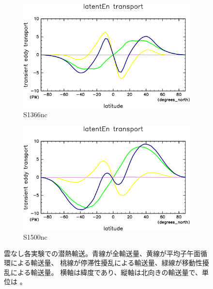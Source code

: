 \documentclass[body]{subfiles}
\begin{document}
\begin{figure}[t]
	\centering
	\begin{subfigure}{.4\textwidth}
		\centering
		\includegraphics[width=\columnwidth]{S1366-nc/MeriHeatTrans@latentEn,time=3650:4015-crop-rotate.pdf}
		\caption{S1366nc}\label{潜熱S1366nc}
	\end{subfigure}
	\begin{subfigure}{.4\textwidth}
		\centering
		\includegraphics[width=\columnwidth]{S1500-nc/MeriHeatTrans@latentEn,time=3650:4015-crop-rotate.pdf}
		\caption{S1500nc}\label{潜熱S1500nc}
	\end{subfigure}
	\caption[雲なし各実験での南北熱輸送量]{
		雲なし各実験での潜熱輸送。青線が全輸送量、黄線が平均子午面循環による輸送量、
		桃線が停滞性擾乱による輸送量、緑線が移動性擾乱による輸送量。
		横軸は緯度であり、縦軸は北向きの輸送量で、単位は 。
	}\label{潜熱nc}
\end{figure}
\end{document}
